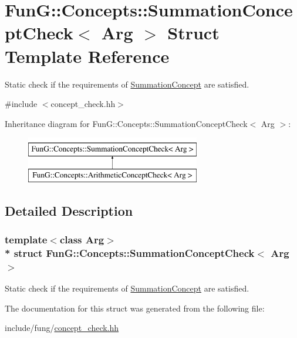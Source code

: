 \hypertarget{structFunG_1_1Concepts_1_1SummationConceptCheck}{}\section{FunG\+:\+:Concepts\+:\+:Summation\+Concept\+Check$<$ Arg $>$ Struct Template Reference}
\label{structFunG_1_1Concepts_1_1SummationConceptCheck}


Static check if the requirements of \hyperlink{structFunG_1_1Concepts_1_1SummationConcept}{Summation\+Concept} are satisfied.  




{\ttfamily \#include $<$concept\+\_\+check.\+hh$>$}

Inheritance diagram for FunG\+:\+:Concepts\+:\+:Summation\+Concept\+Check$<$ Arg $>$\+:\begin{figure}[H]
\begin{center}
\leavevmode
\includegraphics[height=2.000000cm]{structFunG_1_1Concepts_1_1SummationConceptCheck}
\end{center}
\end{figure}


\subsection{Detailed Description}
\subsubsection*{template$<$class Arg$>$\\*
struct Fun\+G\+::\+Concepts\+::\+Summation\+Concept\+Check$<$ Arg $>$}

Static check if the requirements of \hyperlink{structFunG_1_1Concepts_1_1SummationConcept}{Summation\+Concept} are satisfied. 

The documentation for this struct was generated from the following file\+:\begin{DoxyCompactItemize}
\item 
include/fung/\hyperlink{concept__check_8hh}{concept\+\_\+check.\+hh}\end{DoxyCompactItemize}
